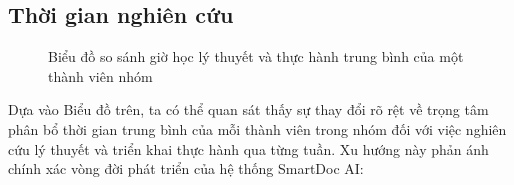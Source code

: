 \documentclass[10pt, conference, a4paper, compsocconf]{IEEEtran}
\begin{document}
\subsection{Thời gian nghiên cứu}

\begin{figure}[htbp]
    \centering %
    
    
    \caption{Biểu đồ so sánh giờ học lý thuyết và thực hành trung bình của một thành viên nhóm}
\end{figure}
Dựa vào Biểu đồ trên, ta có thể quan sát thấy sự thay đổi rõ rệt về trọng tâm phân bổ thời gian trung bình của mỗi thành viên trong nhóm đối với việc nghiên cứu lý thuyết và triển khai thực hành qua từng tuần. Xu hướng này phản ánh chính xác vòng đời phát triển của hệ thống SmartDoc AI:
\end{document}
